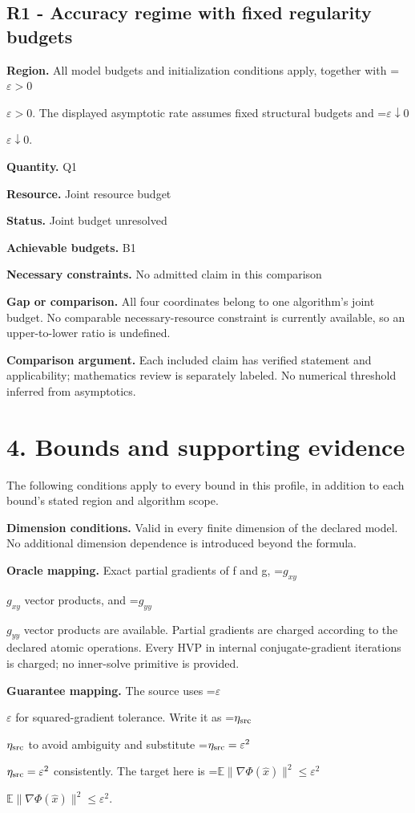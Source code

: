 \documentclass[10pt,a4paper]{article}
\newcommand{\AtlasMath}[1]{\par\begingroup\centering\setbox0=\hbox{$\displaystyle #1$}\ifdim\wd0>1.4\linewidth\typeout{ATLAS WIDE FORMULA: \the\wd0}\fi\ifdim\wd0>\linewidth\resizebox{\linewidth}{!}{\box0}\else\box0\fi\par\endgroup}
\newcommand{\AtlasInlineMath}[1]{\begingroup\setbox0=\hbox{$#1$}\ifdim\wd0>.4\linewidth\endgroup\AtlasMath{#1}\else\endgroup$#1$\fi}
\begin{document}
\subsection{R1 - Accuracy regime with fixed regularity budgets}
\textbf{Region.} All model budgets and initialization conditions apply, together with \AtlasInlineMath{\varepsilon>0}. The displayed asymptotic rate assumes fixed structural budgets and \AtlasInlineMath{\varepsilon\downarrow0}.

\textbf{Quantity.} Q1

\textbf{Resource.} Joint resource budget

\textbf{Status.} Joint budget unresolved

\textbf{Achievable budgets.} B1

\textbf{Necessary constraints.} No admitted claim in this comparison

\textbf{Gap or comparison.} All four coordinates belong to one algorithm’s joint budget. No comparable necessary-resource constraint is currently available, so an upper-to-lower ratio is undefined.

\textbf{Comparison argument.} Each included claim has verified statement and applicability; mathematics review is separately labeled. No numerical threshold inferred from asymptotics.

\section{4. Bounds and supporting evidence}
The following conditions apply to every bound in this profile, in addition to each bound's stated region and algorithm scope.

\textbf{Dimension conditions.} Valid in every finite dimension of the declared model. No additional dimension dependence is introduced beyond the formula.

\textbf{Oracle mapping.} Exact partial gradients of f and g, \AtlasInlineMath{g_{xy}} vector products, and \AtlasInlineMath{g_{yy}} vector products are available. Partial gradients are charged according to the declared atomic operations. Every HVP in internal conjugate-gradient iterations is charged; no inner-solve primitive is provided.

\textbf{Guarantee mapping.} The source uses \AtlasInlineMath{\varepsilon} for squared-gradient tolerance. Write it as \AtlasInlineMath{\eta_{\rm src}} to avoid ambiguity and substitute \AtlasInlineMath{\eta_{\rm src}=\varepsilon^2} consistently. The target here is \AtlasInlineMath{\mathbb E\|\nabla\Phi(\widehat x)\|^2\le\varepsilon^2}.
\end{document}
